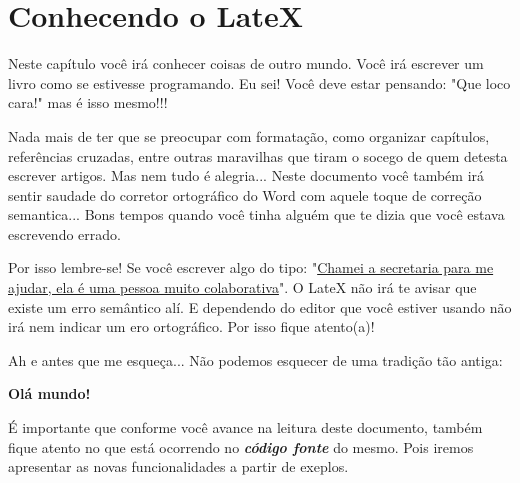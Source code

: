 \chapter{Conhecendo o LateX} \label{capConhecendoLatex}
Neste capítulo você irá conhecer coisas de outro mundo. Você irá escrever um livro como se estivesse programando. Eu sei! Você deve estar pensando: "Que loco cara!" mas é isso mesmo!!!

Nada mais de ter que se preocupar com formatação, como organizar capítulos, referências cruzadas, entre outras maravilhas que tiram o socego de quem detesta escrever artigos. Mas nem tudo é alegria... Neste documento você também irá sentir saudade do corretor ortográfico do Word com aquele toque de correção semantica... Bons tempos quando você tinha alguém que te dizia que você estava escrevendo errado.

Por isso lembre-se! Se você escrever algo do tipo: "\underline{Chamei a secretaria para me ajudar, ela é uma pessoa muito colaborativa}". O LateX não irá te avisar que existe um erro semântico alí. E dependendo do editor que você estiver usando não irá nem indicar um ero ortográfico. Por isso fique atento(a)!

Ah e antes que me esqueça... Não podemos esquecer de uma tradição tão antiga:

\textbf{Olá mundo!}

É importante que conforme você avance na leitura deste documento, também fique atento no que está ocorrendo no \textbf{\textit{código fonte}} do mesmo. Pois iremos apresentar as novas funcionalidades a partir de exeplos.

